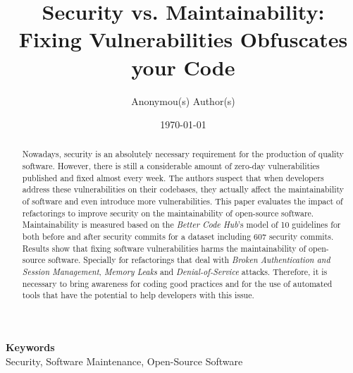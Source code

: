\documentclass[a4paper]{article} %
\date{\today}
\def\keywords#1{\begin{center}{\bf Keywords}\\{#1}\end{center}} %
\begin{document}
\title{Security vs. Maintainability: \\ Fixing Vulnerabilities Obfuscates your Code}

\author{Anonymou(s) Author(s)}


\maketitle

\thispagestyle{empty}

\begin{abstract}

Nowadays, security is an absolutely necessary requirement for the production of quality software. However, there is still a considerable amount of zero-day vulnerabilities published and fixed almost every week. The authors suspect that when developers address these vulnerabilities on their codebases, they actually affect the maintainability of software and even introduce more vulnerabilities. This paper evaluates the impact of refactorings to improve security on the maintainability of open-source software. Maintainability is measured based on the \emph{Better Code Hub}'s model of 10 guidelines for both before and after security commits for a dataset including 607 security commits. Results show that fixing software vulnerabilities harms the maintainability of open-source software. Specially for refactorings that deal with \emph{Broken Authentication and Session Management}, \emph{Memory Leaks} and \emph{Denial-of-Service} attacks. Therefore, it is necessary to bring awareness for coding good practices and for the use of automated tools that have the potential to help developers with this issue.  
 
\end{abstract}

\keywords{Security, Software Maintenance, Open-Source Software} 






\end{document}

